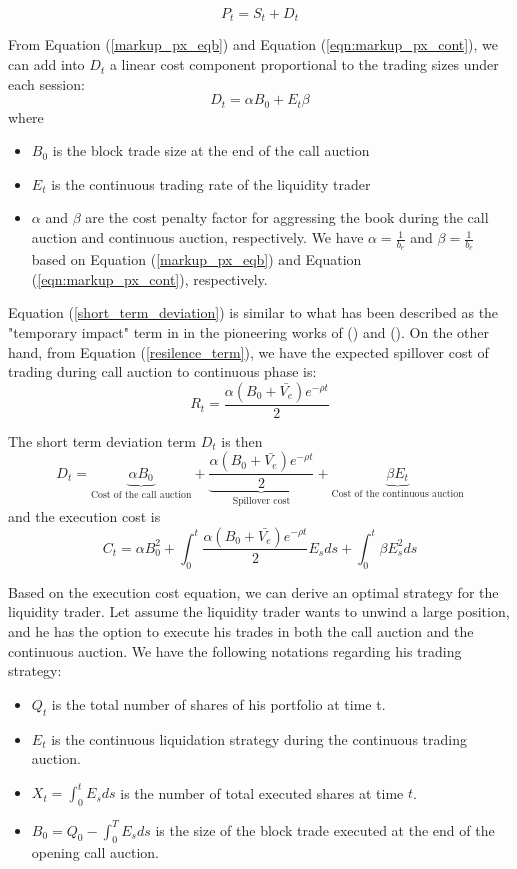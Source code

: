 \[
  P_t = S_t + D_t
\]

From Equation (\ref{markup_px_eqb}) and Equation (\ref{eqn:markup_px_cont}), we can add into $D_t$ a linear cost component proportional to the trading sizes under each session:
\begin{equation}\label{short_term_deviation}
  D_t = \alpha B_0 + E_t \beta
\end{equation}
where
\begin{itemize}
  \item $B_0$ is the block trade size at the end of the call auction
  \item $E_t$ is the continuous trading rate of the liquidity trader
  \item $\alpha$ and $\beta$ are the cost penalty factor for aggressing the book during the call auction and continuous auction, respectively. We have $\alpha=\frac{1}{b_e}$ and $\beta=\frac{1}{b_c}$ based on Equation (\ref{markup_px_eqb}) and Equation (\ref{eqn:markup_px_cont}), respectively.
\end{itemize}
Equation (\ref{short_term_deviation}) is similar to what has been described as the "temporary impact" term in in the pioneering works of (\cite{BertimasLo1999}) and (\cite{Almgren2000}). On the other hand, from Equation (\ref{resilence_term}), we have the expected spillover cost of trading during call auction to continuous phase is:
\[
  R_t = \frac{\alpha (B_0 + \bar{V_e}) e^{-\rho t}}{2}
\]

The short term deviation term $D_t$ is then
\[
  D_t = \underbrace{\alpha B_0 }_\text{Cost of the call auction} +
  \underbrace{\frac{\alpha (B_0 + \bar{V_e}) e^{-\rho t}}{2}}_\text{Spillover cost} +  \underbrace{\beta E_t}_\text{Cost of the continuous auction}
\]
and the execution cost is
\begin{equation}\label{eqn:cost_equation_all}
  C_t = \alpha B_0^2 + \int_0^t \frac{\alpha (B_0 + \bar{V_e}) e^{-\rho t}}{2} E_s ds + \int_0^t \beta E_s^2 ds
\end{equation}

Based on the execution cost equation, we can derive an optimal strategy for the liquidity trader. Let assume the liquidity trader wants to unwind a large position, and he has the option to execute his trades in both the call auction and the continuous auction. We have the following notations regarding his trading strategy:

\begin{itemize}
  \item $Q_t$ is the total number of shares of his portfolio at time t.
  \item $E_t$ is the continuous liquidation strategy during the continuous trading auction.
  \item $X_t=\int_0^t E_s ds$ is the number of total executed shares at time $t$.
  \item $B_0=Q_0 - \int_0^T E_s ds$ is the size of the block trade executed at the end of the opening call auction.
\end{itemize}

